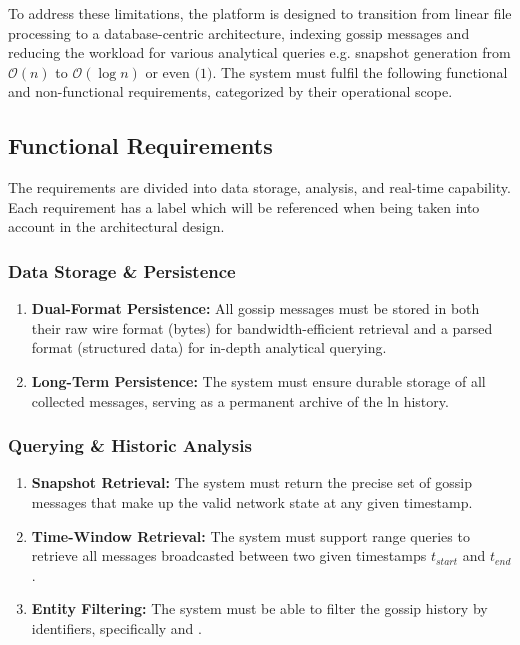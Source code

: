 To address these limitations, the  platform is designed to 
transition from linear file processing to a database-centric architecture,
indexing gossip messages and reducing the workload for various analytical queries
e.g. snapshot generation from $\mathcal{O}(n)$ to $\mathcal{O}(\log n)$ or even $\mathcal(1)$. 
The system must fulfil the following functional and non-functional requirements, 
categorized by their operational scope.

\subsection{Functional Requirements}

The requirements are divided into data storage, analysis, and real-time capability. 
Each requirement has a label which will be referenced when being taken into account in the architectural design.

\subsubsection{Data Storage \& Persistence}
\begin{enumerate}[label=\textbf{RF\arabic*}, ref=RF\arabic*, leftmargin=3.5em]
    \item \label{req:dual-format} \textbf{Dual-Format Persistence:} 
        All gossip messages must be stored in both their raw wire format (bytes) for 
        bandwidth-efficient retrieval and a parsed format (structured data) for in-depth analytical querying.
    \item \label{req:persistance} \textbf{Long-Term Persistence:} 
        The system must ensure durable storage of all collected messages, serving as a permanent archive of the \gls{ln} history.
\end{enumerate}

\subsubsection{Querying \& Historic Analysis}
\begin{enumerate}[label=\textbf{RF\arabic*}, ref=RF\arabic*, resume, leftmargin=3.5em]
    \item \label{req:snapshot} \textbf{Snapshot Retrieval:} 
        The system must return the precise set of gossip messages 
        that make up the valid network state at any given timestamp.
    \item \label{req:snapshot-diff} \textbf{Time-Window Retrieval:} 
        The system must support range queries to retrieve all messages 
        broadcasted between two given timestamps $t_{start}$ and $t_{end}$.
    \item \label{req:entity-filtering} \textbf{Entity Filtering:} 
        The system must be able to filter the gossip history by identifiers, 
        specifically  and .
\end{enumerate}

